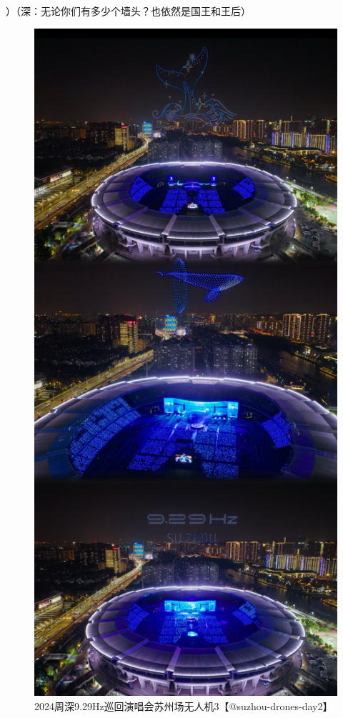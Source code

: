 \documentclass[]{ctexbook}
\begin{document}
）（深：无论你们有多少个墙头？也依然是国王和王后）

\begin{figure}

{\centering \includegraphics[width=400pt]{img/suzhou20241110/001} 

}

\caption{2024周深9.29Hz巡回演唱会苏州场无人机3【@suzhou-drones-day2】}\label{fig:unnamed-chunk-133}
\end{figure}
\end{document}
